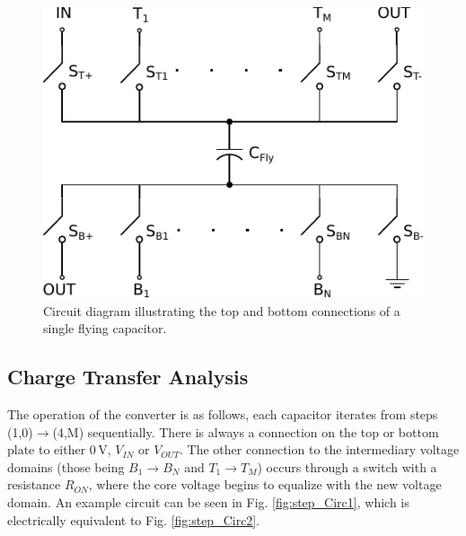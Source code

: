 \documentclass[conference]{IEEEtran}
\begin{document}
	\begin{figure}
		\centering
		\includegraphics[width=0.8\linewidth]{Figures/contRatioCore.pdf}
		\caption{Circuit diagram illustrating the top and bottom connections of a single flying capacitor.}
		\label{fig:coreCon}
	\end{figure}
	\subsection{Charge Transfer Analysis}
	The operation of the converter is as follows, each capacitor iterates from steps (1,0)$\rightarrow$(4,M) sequentially. There is always a connection on the top or bottom plate to either 0$\,$V, $V_{IN}$ or $V_{OUT}$. The other connection to the intermediary voltage domains (those being $B_1 \rightarrow B_N$ and $T_1 \rightarrow T_M$) occurs through a switch with a resistance $R_{ON}$, where the core voltage begins to equalize with the new voltage domain. An example circuit can be seen in Fig. \ref{fig:step_Circ1}, which is electrically equivalent to Fig. \ref{fig:step_Circ2}. 
	
\end{document}
